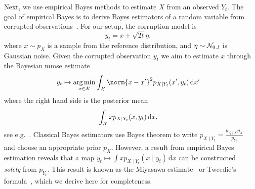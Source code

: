 Next, we use empirical Bayes methods to estimate \( X \) from an observed \( Y_t \).
The goal of empirical Bayes is to derive Bayes estimators of a random variable from corrupted observations~\cite{robbins_empirical_1956}.
For our setup, the corruption model is
\begin{equation}
	y_t = x + \sqrt{\num{2}t} \eta,
	\label{eq:corruption}
\end{equation}
where \( x \sim p_X \) is a sample from the reference distribution, and \( \eta \sim \mathcal{N}_{\num{0}, I}\) is Gaussian noise.
Given the corrupted observation \( y_t \) we aim to estimate \( x \) through the Bayesian \gls{mmse} estimate
\begin{equation}
	y_t \mapsto \argmin_{\Signal \in \mathcal{X}} \int_{\mathcal{X}} \norm{\Signal - \Signal^\prime}^{\num{2}} p_{X\mid Y_t}(\Signal^\prime, \Data_t)\,\mathrm{d}\Signal^\prime
\end{equation}
where the right hand side is the posterior mean
\begin{equation}
	\int_{\mathcal{X}} x p_{X \mid Y_t}(x, y_t)\,\mathrm{d}x,
\end{equation}
see e.g.~\cite[page 172]{Jaynes_2003}.
Classical Bayes estimators use Bayes theorem to write \( p_{X \mid Y_t} = \frac{p_{Y_t\mid X}p_{X}}{p_{Y_t}} \) and choose an appropriate prior \( p_{X} \).
However, a result from empirical Bayes estimation reveals that a map \( y_t \mapsto \int x p_{X \mid Y_t}(x \mid y_t)\,\mathrm{d}x \) can be constructed \emph{solely} from \( p_{Y_t} \).
This result is known as the Miyasawa estimate~\cite{miyasawa_empirical_1961} or Tweedie's formula~\cite{efron_tweedie_2011,raphan_least_2011}, which we derive here for completeness.

